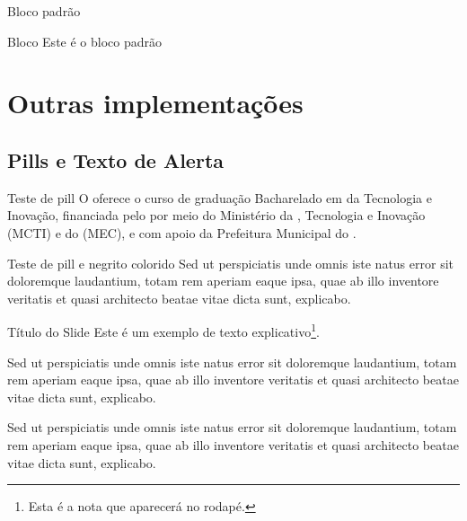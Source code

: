 \documentclass[aspectratio=169]{beamer}
\begin{document}
\begin{frame}{Bloco padrão}

\begin{block}{Bloco}
    Este é o bloco padrão
\end{block}
    
\end{frame}

\section{Outras implementações}

\subsection{Pills e Texto de Alerta}

\begin{frame}{Teste de pill}
  O  oferece o curso de graduação Bacharelado em  da Tecnologia e Inovação, 
  financiada pelo  por meio do Ministério da , Tecnologia e Inovação (MCTI) 
  e do  (MEC), e com apoio da Prefeitura Municipal do .
\end{frame}

\begin{frame}{Teste de pill e negrito colorido}
   Sed ut perspiciatis unde omnis iste natus error sit  
   \alert{doloremque} laudantium, totam rem aperiam eaque ipsa, \alert{quae ab illo} inventore 
   veritatis et quasi architecto \alert{beatae vitae dicta sunt}, explicabo.
\end{frame}

\begin{frame}{Título do Slide}
    Este é um exemplo de texto explicativo\footnote{Esta é a nota que aparecerá no rodapé.}.

    Sed ut perspiciatis unde omnis iste natus error sit  
   \alert{doloremque} laudantium, totam rem aperiam eaque ipsa, \alert{quae ab illo} inventore 
   veritatis et quasi architecto \alert{beatae vitae dicta sunt}, explicabo.

   Sed ut perspiciatis unde omnis iste natus error sit  
   \alert{doloremque} laudantium, totam rem aperiam eaque ipsa, \alert{quae ab illo} inventore 
   veritatis et quasi architecto \alert{beatae vitae dicta sunt}, explicabo.
\end{frame}
\end{document}
